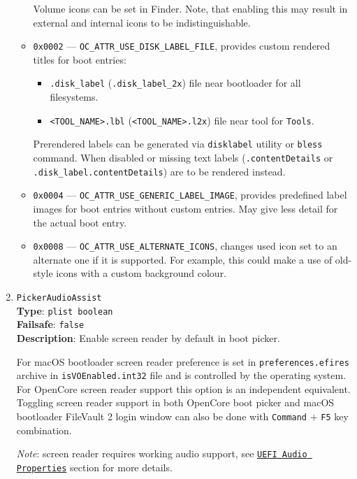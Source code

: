 \documentclass[]{article}
\providecommand{\tightlist}{%
  \setlength{\itemsep}{0pt}\setlength{\parskip}{0pt}}
\begin{document}
\begin{enumerate}
\begin{itemize}
    Volume icons can be set in Finder. Note, that enabling this may result in
    external and internal icons to be indistinguishable.
  \item \texttt{0x0002} --- \texttt{OC\_ATTR\_USE\_DISK\_LABEL\_FILE}, provides custom
    rendered titles for boot entries:
    \begin{itemize}
    \tightlist
      \item \texttt{.disk\_label} (\texttt{.disk\_label\_2x}) file near bootloader for all filesystems.
      \item \texttt{<TOOL\_NAME>.lbl} (\texttt{<TOOL\_NAME>.l2x}) file near tool for \texttt{Tools}.
    \end{itemize}
    Prerendered labels can be generated via \texttt{disklabel} utility or \texttt{bless} command.
    When disabled or missing text labels (\texttt{.contentDetails} or \texttt{.disk\_label.contentDetails})
    are to be rendered instead.
  \item \texttt{0x0004} --- \texttt{OC\_ATTR\_USE\_GENERIC\_LABEL\_IMAGE}, provides predefined
    label images for boot entries without custom entries. May give less detail for the actual
    boot entry.
  \item \texttt{0x0008} --- \texttt{OC\_ATTR\_USE\_ALTERNATE\_ICONS}, changes used icon set to
    an alternate one if it is supported. For example, this could make a use of old-style icons
    with a custom background colour.
  \end{itemize}

\item
  \texttt{PickerAudioAssist}\\
  \textbf{Type}: \texttt{plist\ boolean}\\
  \textbf{Failsafe}: \texttt{false}\\
  \textbf{Description}: Enable screen reader by default in boot picker.

  For macOS bootloader screen reader preference is set in \texttt{preferences.efires}
  archive in \texttt{isVOEnabled.int32} file and is controlled by the operating system.
  For OpenCore screen reader support this option is an independent equivalent.
  Toggling screen reader support in both OpenCore boot picker and macOS bootloader
  FileVault 2 login window can also be done with \texttt{Command} + \texttt{F5} key
  combination.

  \emph{Note}: screen reader requires working audio support, see
  \hyperref[uefiaudioprops]{\texttt{UEFI Audio Properties}}
  section for more details.


\end{enumerate}
\end{document}
